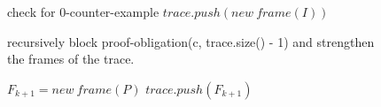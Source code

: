 \documentclass[11pt, a4paper, BCOR=10mm, ngerman]{scrbook}
\begin{document}
\begin{figure}[H]
	\begin{algorithm}[H] 
		\begin{algorithmic}[1]
			\State check for 0-counter-example
			\State $trace.push(new\ frame(I))$
			\Statex
			\Loop
			
			\State recursively block proof-obligation(c, trace.size() - 1)
			\State and strengthen the frames of the trace.
	
			\EndIf
			\EndWhile
			
			\Statex 
			
			\State $F_{k+1} = new\ frame(P)$
			\EndIf
			\EndFor
			\EndIf
			\State $trace.push(F_{k+1})$
			
			\EndLoop
			\EndProcedure
		\end{algorithmic}
	\end{algorithm}
\end{figure}
\end{document}
